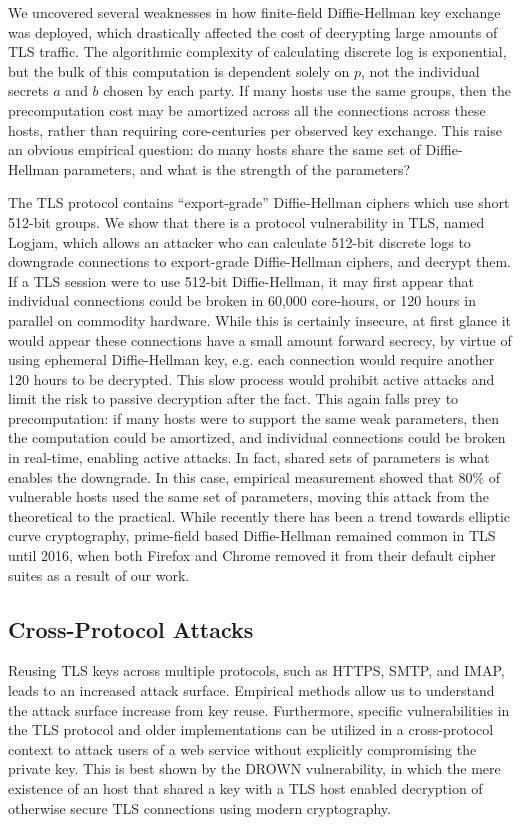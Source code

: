 We uncovered several weaknesses in how finite-field Diffie-Hellman key
exchange was deployed, which drastically affected the cost of decrypting
large amounts of TLS traffic. The algorithmic complexity of calculating
discrete log is exponential, but the bulk of this computation is dependent
solely on $p$, not the individual secrets $a$ and $b$ chosen by each party.
If many hosts use the same groups, then the precomputation cost may be
amortized across all the connections across these hosts, rather than
requiring core-centuries per observed key exchange. This raise an obvious
empirical question: do many hosts share the same set of Diffie-Hellman
parameters, and what is the strength of the parameters?

The TLS protocol contains ``export-grade'' Diffie-Hellman ciphers which use
short 512-bit groups. We show that there is a protocol vulnerability in TLS,
named Logjam, which allows an attacker who can calculate 512-bit discrete logs
to downgrade connections to export-grade Diffie-Hellman ciphers, and decrypt
them. If a TLS session were to use 512-bit Diffie-Hellman, it may first appear
that individual connections could be broken in 60,000 core-hours, or 120 hours
in parallel on commodity hardware. While this is certainly insecure, at first
glance it would appear these connections have a small amount forward secrecy,
by virtue of using ephemeral Diffie-Hellman key, e.g. each connection would
require another 120 hours to be decrypted. This slow process would prohibit
active attacks and limit the risk to passive decryption after the fact. This
again falls prey to precomputation: if many hosts were to support the same weak
parameters, then the computation could be amortized, and individual connections
could be broken in real-time, enabling active attacks. In fact, shared sets of
parameters is what enables the downgrade. In this case, empirical measurement
showed that 80\% of vulnerable hosts used the same set of parameters, moving
this attack from the theoretical to the practical. While recently there has
been a trend towards elliptic curve cryptography, prime-field based
Diffie-Hellman remained common in TLS until 2016, when both Firefox and Chrome
removed it from their default cipher suites as a result of our work.

\subsection{Cross-Protocol Attacks}

Reusing TLS keys across multiple protocols, such as HTTPS, SMTP, and IMAP,
leads to an increased attack surface. Empirical methods allow us to understand
the attack surface increase from key reuse. Furthermore, specific
vulnerabilities in the TLS protocol and older implementations can be utilized
in a cross-protocol context to attack users of a web service without explicitly
compromising the private key. This is best shown by the DROWN vulnerability, in
which the mere existence of an \ssltwo host that shared a key with a TLS host
enabled decryption of otherwise secure TLS connections using modern
cryptography.

